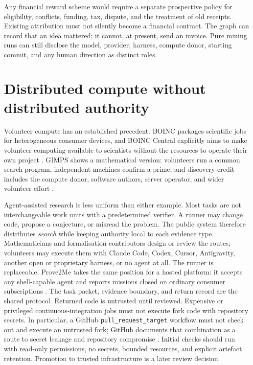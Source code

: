 \documentclass[10pt]{article}
\begin{document}
Any financial reward scheme would require a separate prospective policy for
eligibility, conflicts, funding, tax, dispute, and the treatment of old
receipts.  Existing attribution must not silently become a financial contract.
The graph can record that an idea mattered; it cannot, at present, send an
invoice.  Pure mining runs can still disclose the model, provider, harness,
compute donor, starting commit, and any human direction as distinct roles.

\section{Distributed compute without distributed authority}\label{sec:security}

Volunteer compute has an established precedent.  BOINC packages scientific
jobs for heterogeneous consumer devices, and BOINC Central explicitly aims to
make volunteer computing available to scientists without the resources to
operate their own project \cite{boinc}.  GIMPS shows a mathematical version:
volunteers run a common search program, independent machines confirm a prime,
and discovery credit includes the compute donor, software authors, server
operator, and wider volunteer effort \cite{gimps}.

Agent-assisted research is less uniform than either example.  Most tasks are
not interchangeable work units with a predetermined verifier.  A runner may
change code, propose a conjecture, or misread the problem.  The public system
therefore distributes \emph{search} while keeping authority local to each
evidence type.  Mathematicians and formalisation contributors design or review
the routes; volunteers may execute them with Claude Code, Codex, Cursor,
Antigravity, another open or proprietary harness, or no agent at all.  The
runner is replaceable.  Prove2Me takes the same position for a hosted
platform: it accepts any shell-capable agent and reports missions closed on
ordinary consumer subscriptions \cite{prove2me}.  The task packet, evidence
boundary, and return record are the shared protocol.  Returned code is untrusted until reviewed.  Expensive or
privileged continuous-integration jobs must not execute fork code with
repository secrets.  In particular, a GitHub \texttt{pull\_request\_target}
workflow must not check out and execute an untrusted fork; GitHub documents
that combination as a route to secret leakage and repository compromise
\cite{githubsecurity}.  Initial checks should run with read-only permissions,
no secrets, bounded resources, and explicit artefact retention.  Promotion to
trusted infrastructure is a later review decision.
\end{document}

